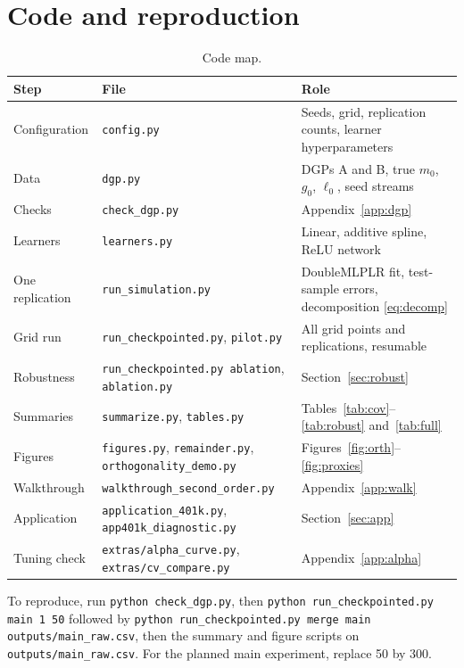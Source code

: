 \documentclass[11pt,a4paper]{article}
\newcommand{\code}[1]{\texttt{#1}}
\begin{document}
\section{Code and reproduction}\label{app:code}

\begin{table}[h]
\centering\small
\caption{Code map.}\label{tab:code}
\begin{tabularx}{\textwidth}{>{\raggedright\arraybackslash}p{2.8cm}>{\raggedright\arraybackslash}p{5.4cm}>{\raggedright\arraybackslash}X}
\toprule
Step & File & Role\\
\midrule
Configuration & \code{config.py} & Seeds, grid, replication counts, learner hyperparameters\\
Data & \code{dgp.py} & DGPs A and B, true $m_0$, $g_0$, $\ell_0$, seed streams\\
Checks & \code{check\_dgp.py} & Appendix~\ref{app:dgp}\\
Learners & \code{learners.py} & Linear, additive spline, ReLU network\\
One replication & \code{run\_simulation.py} & DoubleMLPLR fit, test-sample errors, decomposition \eqref{eq:decomp}\\
Grid run & \code{run\_checkpointed.py}, \code{pilot.py} & All grid points and replications, resumable\\
Robustness & \code{run\_checkpointed.py ablation}, \code{ablation.py} & Section~\ref{sec:robust}\\
Summaries & \code{summarize.py}, \code{tables.py} & Tables~\ref{tab:cov}--\ref{tab:robust} and~\ref{tab:full}\\
Figures & \code{figures.py}, \code{remainder.py}, \code{orthogonality\_demo.py} & Figures~\ref{fig:orth}--\ref{fig:proxies}\\
Walkthrough & \code{walkthrough\_second\_order.py} & Appendix~\ref{app:walk}\\
Application & \code{application\_401k.py}, \code{app401k\_diagnostic.py} & Section~\ref{sec:app}\\
Tuning check & \code{extras/alpha\_curve.py}, \code{extras/cv\_compare.py} & Appendix~\ref{app:alpha}\\
\bottomrule
\end{tabularx}
\end{table}

To reproduce, run \code{python check\_dgp.py}, then \code{python run\_checkpointed.py main 1 50} followed by \code{python run\_checkpointed.py merge main outputs/main\_raw.csv}, then the summary and figure scripts on \code{outputs/main\_raw.csv}. For the planned main experiment, replace 50 by 300.
\end{document}
